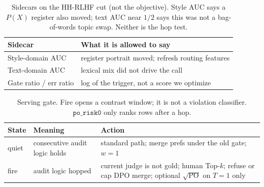 \begin{table}[ht]
\centering
\caption{Sidecars on the HH-RLHF cut (not the objective).
Style AUC says a \(P(X)\) register also moved; text AUC near \(1/2\)
says this was not a bag-of-words topic swap. Neither is the hop test.}
\label{tab:llm-audit-axes}
\small
\begin{tabular}{@{}l l@{}}
\toprule
Sidecar & What it is allowed to say \\
\midrule
Style-domain AUC & register portrait moved; refresh routing features \\
Text-domain AUC & lexical mix did not drive the call \\
Gate ratio / err ratio & log of the trigger, not a score we optimize \\
\bottomrule
\end{tabular}
\end{table}

\begin{table}[ht]
\centering
\caption{Serving gate. Fire opens a contrast window; it is not a
violation classifier. \(\texttt{po\_risk0}\) only ranks rows after a hop.}
\label{tab:llm-audit-gate}
\small
\begin{tabular}{@{}l p{5.4cm} p{5.4cm}@{}}
\toprule
State & Meaning & Action \\
\midrule
quiet & consecutive audit logic holds &
standard path; merge prefs under the old gate; \(w=1\) \\
fire & audit logic hopped &
current judge is not gold; human Top-\(k\); refuse or cap DPO merge;
optional \(\sqrt{\mathrm{PO}}\) on \(T=1\) only \\
\bottomrule
\end{tabular}
\end{table}
